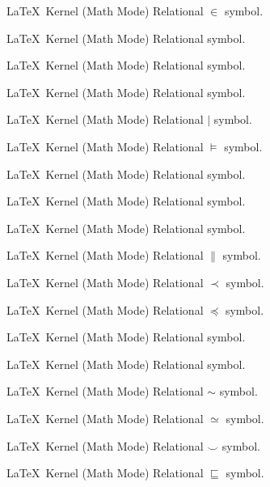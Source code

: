 %
 {}%
 {\LaTeX\ Kernel (Math Mode)}%
 {Relational \ensuremath{\in} symbol.}%
 {}

%
 {}%
 {\LaTeX\ Kernel (Math Mode)}%
 {Relational  symbol.}%
 {}

%
 {}%
 {\LaTeX\ Kernel (Math Mode)}%
 {Relational  symbol.}%
 {}

%
 {}%
 {\LaTeX\ Kernel (Math Mode)}%
 {Relational  symbol.}%
 {}

%
 {}%
 {\LaTeX\ Kernel (Math Mode)}%
 {Relational \ensuremath{\mid} symbol.}%
 {}

%
 {}%
 {\LaTeX\ Kernel (Math Mode)}%
 {Relational \ensuremath{\models} symbol.}%
 {}

%
 {}%
 {\LaTeX\ Kernel (Math Mode)}%
 {Relational  symbol.}%
 {}

%
 {}%
 {\LaTeX\ Kernel (Math Mode)}%
 {Relational  symbol.}%
 {}

%
 {}%
 {\LaTeX\ Kernel (Math Mode)}%
 {Relational  symbol.}%
 {}

%
 {}%
 {\LaTeX\ Kernel (Math Mode)}%
 {Relational \ensuremath{\parallel} symbol.}%
 {}

%
 {}%
 {\LaTeX\ Kernel (Math Mode)}%
 {Relational \ensuremath{\prec} symbol.}%
 {}

%
 {}%
 {\LaTeX\ Kernel (Math Mode)}%
 {Relational \ensuremath{\preceq} symbol.}%
 {}

%
 {}%
 {\LaTeX\ Kernel (Math Mode)}%
 {Relational  symbol.}%
 {}

%
 {}%
 {\LaTeX\ Kernel (Math Mode)}%
 {Relational  symbol.}%
 {}

%
 {}%
 {\LaTeX\ Kernel (Math Mode)}%
 {Relational \ensuremath{\sim} symbol.}%
 {}

%
 {}%
 {\LaTeX\ Kernel (Math Mode)}%
 {Relational \ensuremath{\simeq} symbol.}%
 {}

%
 {}%
 {\LaTeX\ Kernel (Math Mode)}%
 {Relational \ensuremath{\smile} symbol.}%
 {}

%
 {}%
 {\LaTeX\ Kernel (Math Mode)}%
 {Relational \ensuremath{\sqsubseteq} symbol.}%
 {}

